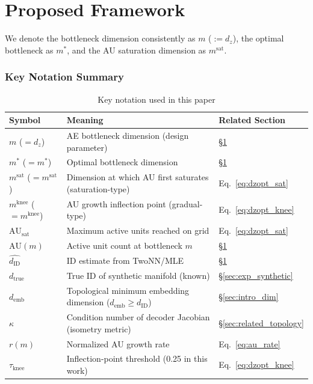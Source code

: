 \documentclass[12pt,a4paper]{article}
\newcommand{\dID}{d_{\mathrm{ID}}}
\newcommand{\dzopt}{m^*}
\newcommand{\dtrue}{d_{\mathrm{true}}}
\newcommand{\kap}{\kappa}
\newcommand{\AUsat}{\mathrm{AU}_{\mathrm{sat}}}
\newcommand{\dzsat}{m^{\mathrm{sat}}}
\newcommand{\mknee}{m^{\mathrm{knee}}}
\newcommand{\demb}{d_{\mathrm{emb}}}
\begin{document}
\section{Proposed Framework}\label{sec:framework}

We denote the bottleneck dimension consistently as $m$ ($:= d_z$), the optimal bottleneck as $m^*$, and the AU saturation dimension as $m^\mathrm{sat}$.

\subsubsection*{Key Notation Summary}
\begin{table}[H]
\centering
\caption{Key notation used in this paper}
\label{tab:notation}
\small
\begin{tabular}{lll}
\toprule
Symbol & Meaning & Related Section \\
\midrule
$m$ ($= d_z$) & AE bottleneck dimension (design parameter) & \S\ref{sec:framework} \\
$\dzopt$ ($= m^*$) & Optimal bottleneck dimension & \S\ref{sec:framework} \\
$\dzsat$ ($= m^{\mathrm{sat}}$) & Dimension at which AU first saturates (saturation-type) & Eq.~\eqref{eq:dzopt_sat} \\
$\mknee$ ($= m^{\mathrm{knee}}$) & AU growth inflection point (gradual-type) & Eq.~\eqref{eq:dzopt_knee} \\
$\AUsat$ & Maximum active units reached on grid & Eq.~\eqref{eq:dzopt_sat} \\
$\mathrm{AU}(m)$ & Active unit count at bottleneck $m$ & \S\ref{sec:framework} \\
$\hat{\dID}$ & ID estimate from TwoNN/MLE & \S\ref{sec:framework} \\
$\dtrue$ & True ID of synthetic manifold (known) & \S\ref{sec:exp_synthetic} \\
$\demb$ & Topological minimum embedding dimension ($\demb \geq \dID$) & \S\ref{sec:intro_dim} \\
$\kap$ & Condition number of decoder Jacobian (isometry metric) & \S\ref{sec:related_topology} \\
$r(m)$ & Normalized AU growth rate & Eq.~\eqref{eq:au_rate} \\
$\tau_{\mathrm{knee}}$ & Inflection-point threshold (0.25 in this work) & Eq.~\eqref{eq:dzopt_knee} \\
\bottomrule
\end{tabular}
\end{table}
\end{document}
